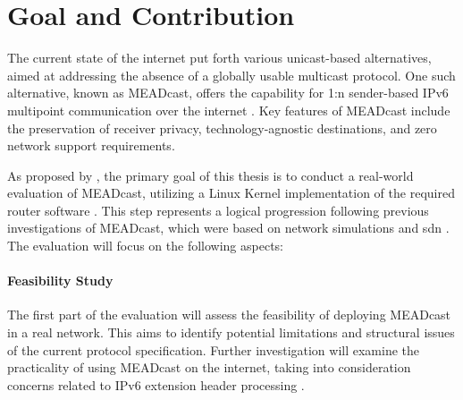 \section{Goal and Contribution} %
\label{sec:Contribution}



The current state of the internet put forth various unicast-based alternatives,
    aimed at addressing the absence of a globally usable multicast protocol.
One such alternative, known as MEADcast, offers the capability for 1:n
    sender-based IPv6 multipoint communication over the internet
    \cite{meadcast1, meadcast2}.
Key features of MEADcast include the preservation of receiver privacy,
    technology-agnostic destinations, and zero network support requirements.

As proposed by \citeauthor{meadcast2}, the primary goal of this thesis is to
    conduct a real-world evaluation of MEADcast, utilizing a Linux Kernel
    implementation of the required router software \cite{meadcast2}.
This step represents a logical progression following previous investigations of
    MEADcast, which were based on network simulations \cite{meadcast1} and
    \gls{sdn} \cite{sdn_ba}.
The evaluation will focus on the following aspects:

\paragraph{Feasibility Study} %
\label{par:Feasibility Study}
The first part of the evaluation will assess the feasibility of deploying
    MEADcast in a real network.
This aims to identify potential limitations and structural issues of the
    current protocol specification.
Further investigation will examine the practicality of using MEADcast on the
    internet, taking into consideration concerns related to IPv6 extension
    header processing \cite{rfc7872_ext_hdrs_drop_rate}.

